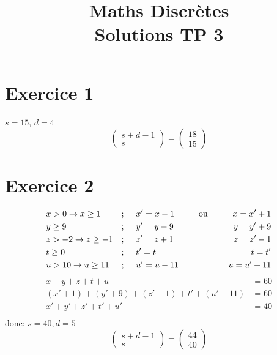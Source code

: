 \documentclass[fontsize=10pt]{article}
\title{\textbf{Maths Discrètes}\\ Solutions TP 3}
\date{}
\begin{document}
\maketitle %


\section*{Exercice 1}
$s = 15$, \hspace{1cm}$d = 4$\\
$$\begin{pmatrix}
s + d -1\\
s
\end{pmatrix}
=
\begin{pmatrix}
18\\
 15
\end{pmatrix}$$
\section*{Exercice 2}
\begin{align*}
&x > 0 \rightarrow x \geq 1 \hspace{0.5cm} &;\hspace{0.5cm}&x' = x-1 \hspace{1cm}\text{ou} \hspace{0.5cm}&x = x'+1 \\
&y \geq 9 &; \hspace{0.5cm}&y' = y-9 & y = y'+9\\
&z>-2 \rightarrow z\geq -1&; \hspace{0.5cm}&z' = z+1 & z = z'-1\\
&t \geq 0 &; \hspace{0.5cm}&t' = t & t = t'\\
&u > 10 \rightarrow u \geq 11 &; \hspace{0.5cm}&u' = u-11 & u = u' +11
\end{align*}
\begin{align*}
x+y+z+t+u &= 60\\
(x'+1)+(y'+9)+(z'-1)+t'+(u'+11) &= 60\\
x'+y'+z'+t'+u' &= 40\\
\end{align*}
donc: $s = 40, d = 5$\\
$$\begin{pmatrix}
s + d -1\\
s
\end{pmatrix}
=
\begin{pmatrix}
44\\
40
\end{pmatrix}$$
\end{document}
